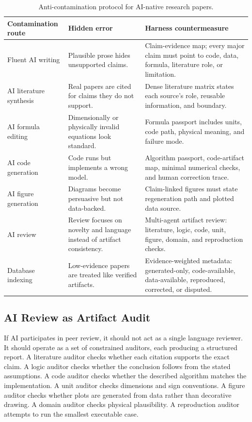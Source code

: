 \documentclass{article}
\begin{document}
\begin{table}[t]
\caption{Anti-contamination protocol for AI-native research papers.}
\centering
\small
\begin{tabular}{p{3.0cm}p{4.4cm}p{5.9cm}}
\toprule
\textbf{Contamination route} & \textbf{Hidden error} & \textbf{Harness countermeasure} \\
\midrule
Fluent AI writing & Plausible prose hides unsupported claims. & Claim-evidence map; every major claim must point to code, data, formula, literature role, or limitation. \\
AI literature synthesis & Real papers are cited for claims they do not support. & Dense literature matrix states each source's role, reusable information, and boundary. \\
AI formula editing & Dimensionally or physically invalid equations look standard. & Formula passport includes units, code path, physical meaning, and failure mode. \\
AI code generation & Code runs but implements a wrong model. & Algorithm passport, code-artifact map, minimal numerical checks, and human correction trace. \\
AI figure generation & Diagrams become persuasive but not data-backed. & Claim-linked figures must state regeneration path and plotted data source. \\
AI review & Review focuses on novelty and language instead of artifact consistency. & Multi-agent artifact review: literature, logic, code, unit, figure, domain, and reproduction checks. \\
Database indexing & Low-evidence papers are treated like verified artifacts. & Evidence-weighted metadata: generated-only, code-available, data-available, reproduced, corrected, or disputed. \\
\bottomrule
\end{tabular}
\label{tab:anti_contamination}
\end{table}

\subsection{AI Review as Artifact Audit}

If AI participates in peer review, it should not act as a single language reviewer. It should operate as a set of constrained auditors, each producing a structured report. A literature auditor checks whether each citation supports the exact claim. A logic auditor checks whether the conclusion follows from the stated assumptions. A code auditor checks whether the described algorithm matches the implementation. A unit auditor checks dimensions and sign conventions. A figure auditor checks whether plots are generated from data rather than decorative drawing. A domain auditor checks physical plausibility. A reproduction auditor attempts to run the smallest executable case.
\end{document}
